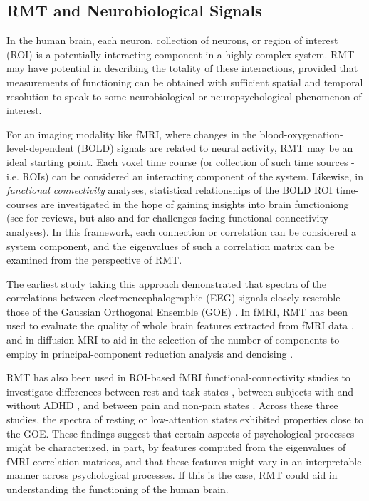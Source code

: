 \documentclass[12pt]{spieman}  %
\begin{document}
\begin{spacing}{2}
\subsection{RMT and Neurobiological Signals}

In the human brain, each neuron, collection of neurons, or region of interest
(ROI) is a potentially-interacting component in a highly complex system. RMT
may have potential in describing the totality of these interactions, provided
that measurements of functioning can be obtained with sufficient spatial and
temporal resolution to speak to some neurobiological or neuropsychological
phenomenon of interest.

For an imaging modality like fMRI, where changes in the
blood-oxygenation-level-dependent (BOLD) signals are related to neural
activity, RMT may be an ideal starting point. Each voxel time course (or
collection of such time sources - i.e. ROIs) can be considered an interacting
component of the system. Likewise, in \textit{functional connectivity}
analyses, statistical relationships of the BOLD ROI time-courses are
investigated in the hope of gaining insights into brain functioniong (see
 for reviews, but also
 and
 for challenges facing functional
connectivity analyses). In this framework, each connection or correlation can
be considered a system component, and the eigenvalues of such a correlation
matrix can be examined from the perspective of RMT.

The earliest study taking this approach
demonstrated that spectra of the correlations between electroencephalographic
(EEG) signals closely resemble those of the Gaussian Orthogonal Ensemble (GOE)
\cite{sebaRandomMatrixAnalysis2003}. In fMRI, RMT has been used to
evaluate the quality of whole brain features extracted from fMRI data
\cite{voultsidouFeatureEvaluationFMRI2007,verganiRestingStateFMRI2019}, and in
diffusion MRI to aid in the selection of the number of
components to employ in principal-component reduction analysis and denoising
\cite{veraartDenoisingDiffusionMRI2016,verganiRestingStateFMRI2019,ulfarssonDimensionEstimationNoisy2008}.

RMT has also been used in ROI-based fMRI functional-connectivity studies to
investigate differences between rest and task states
\cite{wangSpectralPropertiesTemporal2015}, between subjects with and without
ADHD \cite{wangRandomMatrixTheory2016}, and between pain and non-pain states
\cite{matharooSpontaneousBackpainAlters2020}. Across these three studies, the
spectra of resting or low-attention states exhibited properties close to the
GOE. These findings suggest that certain aspects of psychological processes
might be characterized, in part, by features computed from the eigenvalues of
fMRI correlation matrices, and that these features might vary in an
interpretable manner across psychological processes. If this is the case, RMT
could aid in understanding the functioning of the human brain.



\end{spacing}
\end{document}
